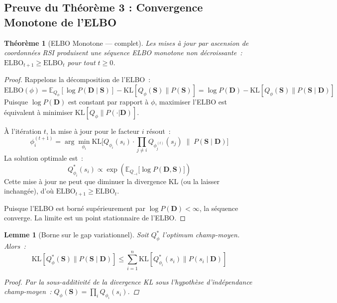 \documentclass[letterpaper]{article}
\newtheorem{theoreme}{Th\'eor\`eme}
\newtheorem{lemme}{Lemme}
\begin{document}
\subsection{Preuve du Th\'eor\`eme 3 : Convergence Monotone de l'ELBO}

\begin{theoreme}[ELBO Monotone --- complet]
Les mises \`a jour par ascension de coordonn\'ees RSI produisent une
s\'equence ELBO monotone non d\'ecroissante~:
$\mathrm{ELBO}_{t+1} \geq \mathrm{ELBO}_t$ pour tout $t \geq 0$.
\end{theoreme}

\begin{proof}
Rappelons la d\'ecomposition de l'ELBO~:
\[
  \mathrm{ELBO}(\phi) = \mathbb{E}_{Q_\phi}[\log P(\mathbf{D} \mid \mathbf{S})]
  - \mathrm{KL}[Q_\phi(\mathbf{S}) \| P(\mathbf{S})]
  = \log P(\mathbf{D}) - \mathrm{KL}[Q_\phi(\mathbf{S}) \| P(\mathbf{S} \mid \mathbf{D})]
\]
Puisque $\log P(\mathbf{D})$ est constant par rapport \`a $\phi$,
maximiser l'ELBO est \'equivalent \`a minimiser
$\mathrm{KL}[Q_\phi \| P(\cdot|\mathbf{D})]$.

\`A l'it\'eration $t$, la mise \`a jour pour le facteur $i$ r\'esout~:
\[
  \phi_i^{(t+1)} = \arg\min_{\phi_i}
  \mathrm{KL}\bigl[Q_{\phi_i}(s_i) \cdot \prod_{j \neq i}
  Q_{\phi_j^{(t)}}(s_j) \;\|\; P(\mathbf{S} \mid \mathbf{D})\bigr]
\]
La solution optimale est~:
\[
  Q_{\phi_i}^*(s_i) \propto \exp\!\left(
  \mathbb{E}_{Q_{-i}}\bigl[\log P(\mathbf{D}, \mathbf{S})\bigr]
  \right)
\]
Cette mise \`a jour ne peut que diminuer la divergence KL (ou la
laisser inchang\'ee), d'o\`u $\mathrm{ELBO}_{t+1} \geq \mathrm{ELBO}_t$.

Puisque l'ELBO est born\'e sup\'erieurement par $\log P(\mathbf{D})
< \infty$, la s\'equence converge. La limite est un point stationnaire
de l'ELBO.
\end{proof}

\begin{lemme}[Borne sur le gap variationnel]
Soit $Q_\phi^*$ l'optimum champ-moyen. Alors~:
\[
  \mathrm{KL}[Q_\phi^*(\mathbf{S}) \| P(\mathbf{S} \mid \mathbf{D})]
  \leq \sum_{i=1}^n \mathrm{KL}[Q_{\phi_i}^*(s_i) \| P(s_i \mid \mathbf{D})]
\]
\begin{proof}
Par la sous-additivit\'e de la divergence KL sous l'hypoth\`ese
d'ind\'ependance champ-moyen~:
$Q_\phi(\mathbf{S}) = \prod_i Q_{\phi_i}(s_i)$.
\end{proof}
\end{lemme}

\end{document}
